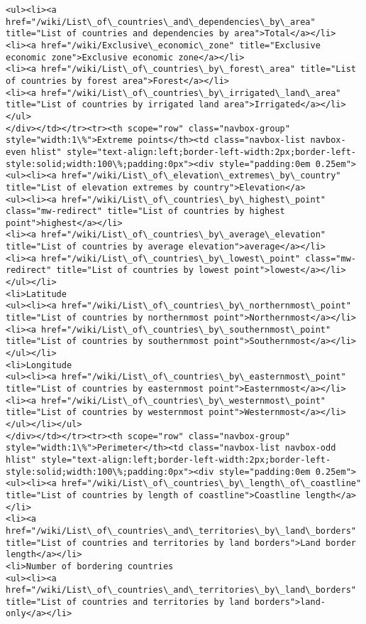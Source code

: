 \documentclass[11pt]{article}
\begin{document}
\begin{Verbatim}[commandchars=\\\{\}]
<ul><li><a href="/wiki/List\_of\_countries\_and\_dependencies\_by\_area" title="List of countries and dependencies by area">Total</a></li>
<li><a href="/wiki/Exclusive\_economic\_zone" title="Exclusive economic zone">Exclusive economic zone</a></li>
<li><a href="/wiki/List\_of\_countries\_by\_forest\_area" title="List of countries by forest area">Forest</a></li>
<li><a href="/wiki/List\_of\_countries\_by\_irrigated\_land\_area" title="List of countries by irrigated land area">Irrigated</a></li></ul>
</div></td></tr><tr><th scope="row" class="navbox-group" style="width:1\%">Extreme points</th><td class="navbox-list navbox-even hlist" style="text-align:left;border-left-width:2px;border-left-style:solid;width:100\%;padding:0px"><div style="padding:0em 0.25em">
<ul><li><a href="/wiki/List\_of\_elevation\_extremes\_by\_country" title="List of elevation extremes by country">Elevation</a>
<ul><li><a href="/wiki/List\_of\_countries\_by\_highest\_point" class="mw-redirect" title="List of countries by highest point">highest</a></li>
<li><a href="/wiki/List\_of\_countries\_by\_average\_elevation" title="List of countries by average elevation">average</a></li>
<li><a href="/wiki/List\_of\_countries\_by\_lowest\_point" class="mw-redirect" title="List of countries by lowest point">lowest</a></li></ul></li>
<li>Latitude
<ul><li><a href="/wiki/List\_of\_countries\_by\_northernmost\_point" title="List of countries by northernmost point">Northernmost</a></li>
<li><a href="/wiki/List\_of\_countries\_by\_southernmost\_point" title="List of countries by southernmost point">Southernmost</a></li></ul></li>
<li>Longitude
<ul><li><a href="/wiki/List\_of\_countries\_by\_easternmost\_point" title="List of countries by easternmost point">Easternmost</a></li>
<li><a href="/wiki/List\_of\_countries\_by\_westernmost\_point" title="List of countries by westernmost point">Westernmost</a></li></ul></li></ul>
</div></td></tr><tr><th scope="row" class="navbox-group" style="width:1\%">Perimeter</th><td class="navbox-list navbox-odd hlist" style="text-align:left;border-left-width:2px;border-left-style:solid;width:100\%;padding:0px"><div style="padding:0em 0.25em">
<ul><li><a href="/wiki/List\_of\_countries\_by\_length\_of\_coastline" title="List of countries by length of coastline">Coastline length</a></li>
<li><a href="/wiki/List\_of\_countries\_and\_territories\_by\_land\_borders" title="List of countries and territories by land borders">Land border length</a></li>
<li>Number of bordering countries
<ul><li><a href="/wiki/List\_of\_countries\_and\_territories\_by\_land\_borders" title="List of countries and territories by land borders">land-only</a></li>

\end{Verbatim}
\end{document}
